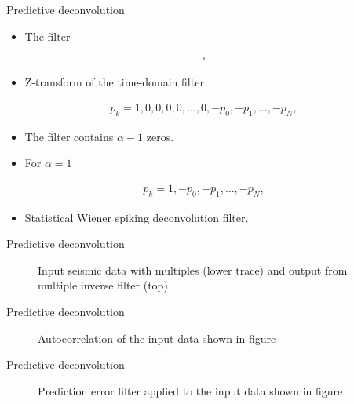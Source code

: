 \documentclass[xcolor=dvipsnames,notes]{beamer}
\begin{document}
\begin{frame}{Predictive deconvolution}
\begin{itemize}
\item The filter
\end{itemize}
%
\begin{eqnarray}
  [1 -z^{\alpha}P(z)],
\end{eqnarray}
\begin{itemize}
 \item Z-transform of the time-domain filter
\end{itemize}
%
\begin{eqnarray}
p_k = 1,0,0,0,0,\ldots,0,-p_0,-p_1,\ldots,-p_N,
                         \label{eq:prederr7}
\end{eqnarray}
%
\begin{itemize}
\item The filter contains $\alpha-1$ zeros. 
\item For $\alpha=1$
\end{itemize}
%
\begin{eqnarray}
p_k = 1,-p_0,-p_1,\ldots,-p_N,
\end{eqnarray}
\begin{itemize}
\item Statistical Wiener spiking deconvolution filter.
\end{itemize}
\end{frame}
%
\begin{frame}{Predictive deconvolution}
%
\begin{figure}[b]
\caption{Input seismic data with multiples (lower trace) and output from 
         multiple inverse filter (top)}
\label{fig:mulre}
\end{figure}
\end{frame}
%
\begin{frame}{Predictive deconvolution}
\begin{figure}[h]
\caption{Autocorrelation of the input data shown in figure \protect{\ref{fig:mulre}}}
\label{fig:prederr-acorr}
\end{figure}
\end{frame}
%
\begin{frame}{Predictive deconvolution}
%
\begin{figure}[h]
\caption{Prediction error filter applied to the input data shown in figure \protect{\ref{fig:mulre}}}
\label{fig:prederr-out}
\end{figure}
%
\end{frame}
\end{document}
